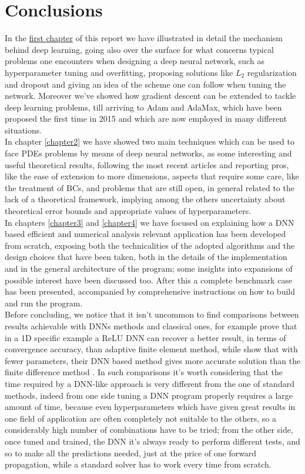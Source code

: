 \documentclass[12pt, a4paper]{report}
\theoremstyle{definition}
\begin{document}
\chapter*{Conclusions}
In the \hyperref[chapter1]{first chapter} of this report we have illustrated in detail the mechanism behind deep learning, going also over the surface for what concerns typical problems one encounters when designing a deep neural network, such as hyperparameter tuning and overfitting, proposing solutions like $L_2$ regularization and dropout and giving an idea of the scheme one can follow when tuning the network. Moreover we've showed how gradient descent can be extended to tackle deep learning problems, till arriving to Adam and AdaMax, which have been proposed the first time in 2015 and which are now employed in many different situations.\\
In chapter \ref{chapter2} we have showed two main techniques which can be used to face PDEs problems by means of deep neural networks, as some interesting and useful theoretical results, following the most recent articles and reporting pros, like the ease of extension to more dimensions, aspects that require some care, like the treatment of BCs, and problems that are still open, in general related to the lack of a theoretical framework, implying among the others uncertainty about theoretical error bounds and appropriate values of hyperparameters.\\
In chapters \ref{chapter3} and \ref{chapter4} we have focused on explaining how a DNN based efficient and numerical analysis relevant application has been developed from scratch, exposing both the technicalities of the adopted algorithms and the design choices that have been taken, both in the details of the implementation and in the general architecture of the program; some insights into expansions of possible interest have been discussed too. After this a complete benchmark case  has been presented, accompanied by comprehensive instructions on how to build and run the program.\\
Before concluding, we notice that it isn't uncommon to find comparisons between results achievable with DNNs methods and classical ones, for example \cite{Jinchao} prove that in a 1D specific example a ReLU DNN can recover a better result, in terms of convergence accuracy, than adaptive finite element method, while \cite{Weinan} show that with fewer parameters, their DNN based method gives more accurate solution than the finite difference method . In such comparisons it's worth considering that the time required by a DNN-like approach is very different from the one of standard methods, indeed from one side tuning a DNN program properly requires a large amount of time, because even hyperparameters which have given great results in one field of application are often completely not suitable to the others, so a considerably high number of combinations have to be tried; from the other side, once tuned and trained, the DNN it's always ready to perform different tests, and so to make all the predictions needed, just at the price of one forward propagation, while a standard solver has to work every time from scratch.\\ 
\end{document}
